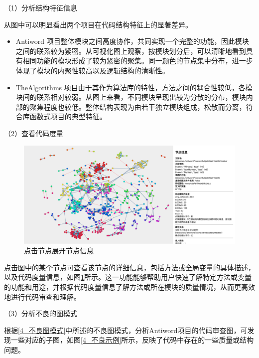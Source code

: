 \noindent（1）分析结构特征信息

从图中可以明显看出两个项目在代码结构特征上的显著差异。
\begin{itemize}
    \item Antiword 项目整体模块之间高度协作，共同实现一个完整的功能，因此模块之间的联系较为紧密。从可视化图上观察，按模块划分后，可以清晰地看到具有相同功能的模块形成了较为紧密的聚集。同一颜色的节点集中分布，进一步体现了模块的内聚性较高以及逻辑结构的清晰性。
    
    \item TheAlgorithms 项目由于其作为算法库的特性，方法之间的耦合性较低，各模块间的联系相对较弱。从图上来看，不同模块呈现出较为分散的分布，模块内部的聚集程度也较低。整体结构表现为由若干独立模块组成，松散而分离，符合库函数式项目的典型特征。
\end{itemize}

\noindent（2）查看代码度量

\begin{figure}[h]
\centering
\includegraphics[width = 1\textwidth]{figures/点击节点查看.png}
\caption{点击节点展开节点信息}
\label{4_查看度量}
\end{figure}

 点击图中的某个节点可查看该节点的详细信息，包括方法或全局变量的具体描述，以及代码度量信息，如图\ref{4_查看度量}所示。这一功能能够帮助用户快速了解特定方法或变量的功能和用途，并根据代码度量信息了解方法或所在模块的质量情况，从而更高效地进行代码审查和理解。

\noindent（3）分析不良的图模式

根据\ref{4_不良图模式}中所述的不良图模式，分析Antiword项目的代码审查图，可发现一些对应的子图，如图\ref{4_不良示例}所示，反映了代码中存在的一些质量或结构问题。


